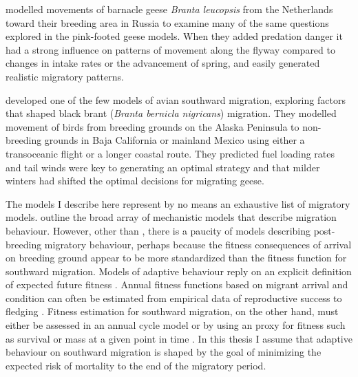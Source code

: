 \citet{Jonker2010} modelled movements of barnacle geese \textit{Branta leucopsis} from the Netherlands toward their breeding area in Russia to examine many of the same questions explored in the pink-footed geese models. When they added predation danger it had a strong influence on patterns of movement along the flyway compared to changes in intake rates or the advancement of spring, and easily generated realistic migratory patterns. 

\citet{brantModel2007} developed one of the few models of avian southward migration, exploring factors that shaped black brant (\textit{Branta bernicla nigricans}) migration. They modelled movement of birds from breeding grounds on the Alaska Peninsula to non-breeding grounds in Baja California or mainland Mexico using either a transoceanic flight or a longer coastal route. They predicted fuel loading rates and tail winds were key to generating an optimal strategy and that milder winters had shifted the optimal decisions for migrating geese.

The models I describe here represent by no means an exhaustive list of migratory models. \citet{Bauer2013} outline the broad array of mechanistic models that describe migration behaviour. However, other than \citet{brantModel2007}, there is a paucity of models describing post-breeding migratory behaviour, perhaps because the fitness consequences of arrival on breeding ground appear to be more standardized than the fitness function for southward migration. Models of adaptive behaviour reply on an explicit definition of expected future fitness \citep{houston1999models}.  Annual fitness functions based on migrant arrival and condition can often be estimated from empirical data of reproductive success to fledging \citep{Lameris2017}. Fitness estimation for southward migration, on the other hand, must either be assessed in an annual cycle model or by using an proxy for fitness such as survival or mass at a given point in time \citep{Weber1999a,Alves2013a}. In this thesis I assume that adaptive behaviour on southward migration is shaped by the goal of minimizing the expected risk of mortality to the end of the migratory period.





